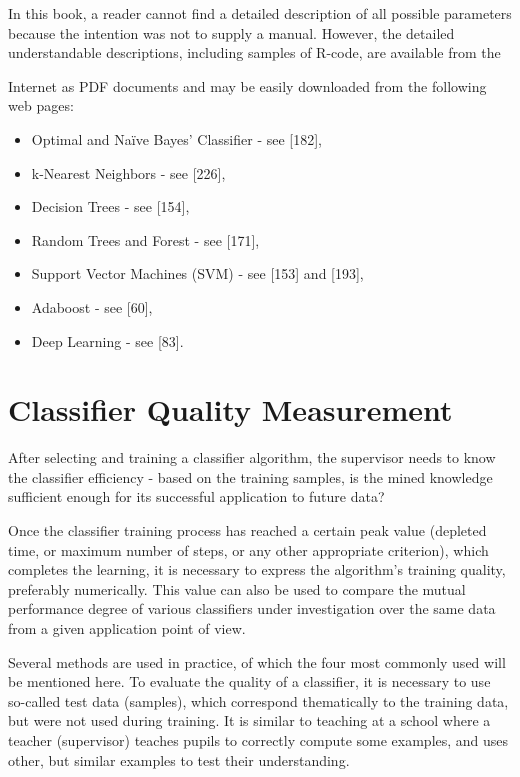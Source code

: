 \documentclass[11pt,openany,executivepaper]{book}
\begin{document}
In this book, a reader cannot find a detailed description of all possible parameters because the intention was not to supply a manual. However, the detailed understandable descriptions, including samples of R-code, are available from the

Internet as PDF documents and may be easily downloaded from the following web pages:

\begin{itemize}
  \item Optimal and Naïve Bayes' Classifier - see [182],
  \item k-Nearest Neighbors - see [226],
  \item Decision Trees - see [154],
  \item Random Trees and Forest - see [171],
  \item Support Vector Machines (SVM) - see [153] and [193],
  \item Adaboost - see [60],
  \item Deep Learning - see [83].
\end{itemize}

\section{Classifier Quality Measurement}

After selecting and training a classifier algorithm, the supervisor needs to know the classifier efficiency - based on the training samples, is the mined knowledge sufficient enough for its successful application to future data?

Once the classifier training process has reached a certain peak value (depleted time, or maximum number of steps, or any other appropriate criterion), which completes the learning, it is necessary to express the algorithm's training quality, preferably numerically. This value can also be used to compare the mutual performance degree of various classifiers under investigation over the same data from a given application point of view.

Several methods are used in practice, of which the four most commonly used will be mentioned here. To evaluate the quality of a classifier, it is necessary to use so-called test data (samples), which correspond thematically to the training data, but were not used during training. It is similar to teaching at a school where a teacher (supervisor) teaches pupils to correctly compute some examples, and uses other, but similar examples to test their understanding.
\end{document}
